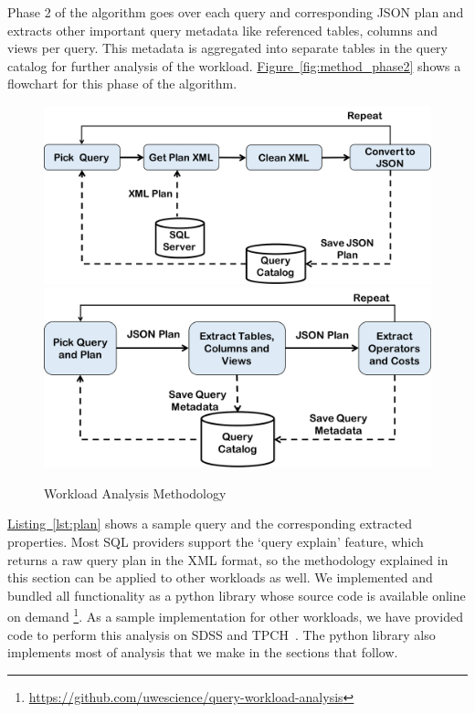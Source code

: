 \documentclass{sig-alternate}
\newcommand{\figref}[1]{\hyperref[#1]{Figure~\ref*{#1}}}
\newcommand{\lstref}[1]{\hyperref[#1]{Listing~\ref*{#1}}}
\begin{document}
Phase 2 of the algorithm goes over each query and corresponding JSON plan and extracts other important query metadata like referenced tables, columns and views per query. This metadata is aggregated into separate tables in the query catalog for further analysis of the workload. \figref{fig:method_phase2} shows a flowchart for this phase of the algorithm.

\begin{figure}
  \centering
    {\includegraphics[width=.4\linewidth]{method_phase1.pdf}}
    {\includegraphics[width=.4\linewidth]{method_phase2.pdf}}
\caption{Workload Analysis Methodology}
\vspace{-15pt}
\end{figure}

\lstref{lst:plan} shows a sample query and the corresponding extracted properties.
Most SQL providers support the `query explain' feature, which returns a raw query plan in the XML format, so the methodology explained in this section can be applied to other workloads as well. 
We implemented and bundled all functionality as a python library whose source code is available online on demand \footnote{\url{https://github.com/uwescience/query-workload-analysis}}.
As a sample implementation for other workloads, we have provided code to perform this analysis on SDSS and TPCH~\cite{council2008tpc}.
The python library also implements most of analysis that we make in the sections that follow.
\end{document}
